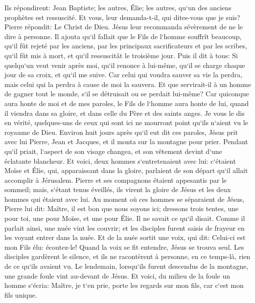 \verse Ils répondirent: Jean Baptiste; les autres, Élie; les autres, qu`un des anciens prophètes est ressuscité. 
\verse Et vous, leur demanda-t-il, qui dites-vous que je suis? Pierre répondit: Le Christ de Dieu. 
\verse Jésus leur recommanda sévèrement de ne le dire à personne. 
\verse Il ajouta qu`il fallait que le Fils de l`homme souffrît beaucoup, qu`il fût rejeté par les anciens, par les principaux sacrificateurs et par les scribes, qu`il fût mis à mort, et qu`il ressuscitât le troisième jour. 
\verse Puis il dit à tous: Si quelqu`un veut venir après moi, qu`il renonce à lui-même, qu`il se charge chaque jour de sa croix, et qu`il me suive. 
\verse Car celui qui voudra sauver sa vie la perdra, mais celui qui la perdra à cause de moi la sauvera. 
\verse Et que servirait-il à un homme de gagner tout le monde, s`il se détruisait ou se perdait lui-même? 
\verse Car quiconque aura honte de moi et de mes paroles, le Fils de l`homme aura honte de lui, quand il viendra dans sa gloire, et dans celle du Père et des saints anges. 
\verse Je vous le dis en vérité, quelques-uns de ceux qui sont ici ne mourront point qu`ils n`aient vu le royaume de Dieu. 
\verse Environ huit jours après qu`il eut dit ces paroles, Jésus prit avec lui Pierre, Jean et Jacques, et il monta sur la montagne pour prier. 
\verse Pendant qu`il priait, l`aspect de son visage changea, et son vêtement devint d`une éclatante blancheur. 
\verse Et voici, deux hommes s`entretenaient avec lui: c`étaient Moïse et Élie, 
\verse qui, apparaissant dans la gloire, parlaient de son départ qu`il allait accomplir à Jérusalem. 
\verse Pierre et ses compagnons étaient appesantis par le sommeil; mais, s`étant tenus éveillés, ils virent la gloire de Jésus et les deux hommes qui étaient avec lui. 
\verse Au moment où ces hommes se séparaient de Jésus, Pierre lui dit: Maître, il est bon que nous soyons ici; dressons trois tentes, une pour toi, une pour Moïse, et une pour Élie. Il ne savait ce qu`il disait. 
\verse Comme il parlait ainsi, une nuée vint les couvrir; et les disciples furent saisis de frayeur en les voyant entrer dans la nuée. 
\verse Et de la nuée sortit une voix, qui dit: Celui-ci est mon Fils élu: écoutez-le! 
\verse Quand la voix se fit entendre, Jésus se trouva seul. Les disciples gardèrent le silence, et ils ne racontèrent à personne, en ce temps-là, rien de ce qu`ils avaient vu. 
\verse Le lendemain, lorsqu`ils furent descendus de la montagne, une grande foule vint au-devant de Jésus. 
\verse Et voici, du milieu de la foule un homme s`écria: Maître, je t`en prie, porte les regards sur mon fils, car c`est mon fils unique. 
